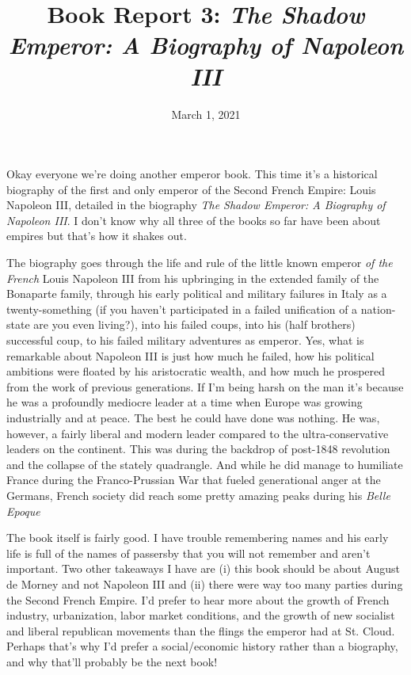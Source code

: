 \documentclass[12pt]{article}
\title{\vspace{-20mm} \textbf{Book Report 3: \emph{The Shadow Emperor: A Biography of Napoleon III}}}
\begin{document}
\date{March 1, 2021}
\maketitle
\thispagestyle{empty} %

Okay everyone we're doing another emperor book. This time it's a historical biography of the first and only emperor of the Second French Empire: Louis Napoleon III, detailed in the biography \emph{The Shadow Emperor: A Biography of Napoleon III}. I don't know why all three of the books so far have been about empires but that's how it shakes out. 

\vspace{5mm}

The biography goes through the life and rule of the little known emperor \emph{of the French} Louis Napoleon III from his upbringing in the extended family of the Bonaparte family, through his early political and military failures in Italy as a twenty-something (if you haven't participated in a failed unification of a nation-state are you even living?), into his failed coups, into his (half brothers) successful coup, to his failed military adventures as emperor. Yes, what is remarkable about Napoleon III is just how much he failed, how his political ambitions were floated by his aristocratic wealth, and how much he prospered from the work of previous generations. If I'm being harsh on the man it's because he was a profoundly mediocre leader at a time when Europe was growing industrially and at peace. The best he could have done was nothing. He was, however, a fairly liberal and modern leader compared to the ultra-conservative leaders on the continent. This was during the backdrop of post-1848 revolution and the collapse of the stately quadrangle. And while he did manage to humiliate France during the Franco-Prussian War that fueled generational anger at the Germans, French society did reach some pretty amazing peaks during his \emph{Belle Epoque} 

\vspace{5mm}

The book itself is fairly good. I have trouble remembering names and his early life is full of the names of passersby that you will not remember and aren't important. Two other takeaways I have are (i) this book should be about August de Morney and not Napoleon III and (ii) there were way too many parties during the Second French Empire. I'd prefer to hear more about the growth of French industry, urbanization, labor market conditions, and the growth of new socialist and liberal republican movements than the flings the emperor had at St. Cloud. Perhaps that's why I'd prefer a social/economic history rather than a biography, and why that'll probably be the next book!
\end{document}
